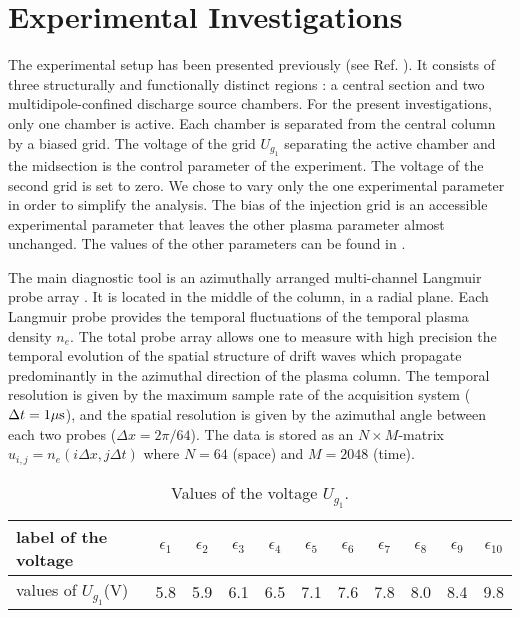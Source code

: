 \section{Experimental Investigations}\label{Experimental}
The experimental setup has been presented previously (see Ref.
\cite{Madon96,latten95}). It consists of three structurally and
functionally distinct regions : a central section and two
multidipole-confined discharge source chambers. 
For the present investigations, only one chamber is active.
Each chamber is separated from the central column by a biased grid.
The voltage of the grid $U_{g_1}$ separating the active chamber and the
midsection is the control parameter of the experiment. The voltage of
the second grid is set to zero. We chose to vary only the one
experimental parameter 
in order to simplify the analysis. The bias of the
injection grid is an accessible experimental parameter
that leaves the other plasma parameter almost unchanged.
The values of the other parameters can be found in \cite{Madon96}.

The main diagnostic tool is an azimuthally arranged multi-channel
Langmuir probe array \cite{latten95}. It is located in the middle of
the column, in a radial plane. Each Langmuir probe provides
the temporal fluctuations of the temporal plasma density $n_e$.
The total probe array allows one to measure with high precision
the temporal evolution of the spatial 
structure of drift waves which propagate predominantly in the azimuthal 
direction of the plasma column.
The temporal resolution is given by the maximum sample 
rate of the acquisition system ($\Delta t=1\mu{\rm s}$), and the spatial
resolution is given by the azimuthal angle between each two probes
($\Delta x=2\pi/64$). The data is stored as an $N \times M$-matrix
$u_{i,j}=n_{e}(i\Delta x,j\Delta t)$ where $N=64$ (space) and $M=2048$ 
(time). 


\begin{table}[htb]
 \begin{center}
  \caption{Values of the voltage $U_{g_1}$.}
  \label{values}
  \begin{tabular}{l|c|c|c|c|c|c|c|c|c|c}
label of the voltage     &$\epsilon_1$ &$\epsilon_2$ &$\epsilon_3$ &$\epsilon_4$ &$\epsilon_5$ &$\epsilon_6$ &$\epsilon_7$ &$\epsilon_8$ &$\epsilon_9$ &$\epsilon_{10}$\\
\hline
values of $U_{g_1}$(V) &5.8&5.9&6.1&6.5&7.1&7.6&7.8&8.0&8.4&9.8
  \end{tabular}
\end{center}
\end{table}

